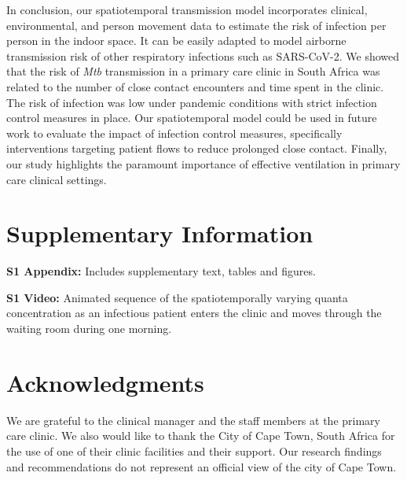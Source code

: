 \documentclass[fleqn,11pt]{wlscirep}
\begin{document}
In conclusion, our spatiotemporal transmission model incorporates clinical, environmental, and person movement data to estimate the risk of infection per person in the indoor space. It can be easily adapted to model airborne transmission risk of other respiratory infections such as SARS-CoV-2. We showed that the risk of \emph{Mtb} transmission in a primary care clinic in South Africa was related to the number of close contact encounters and time spent in the clinic. The risk of infection was low under pandemic conditions with strict infection control measures in place. Our spatiotemporal model could be used in future work to evaluate the impact of infection control measures, specifically interventions targeting patient flows to reduce prolonged close contact. Finally, our study highlights the paramount importance of effective ventilation in primary care clinical settings. 


\newpage

\section*{Supplementary Information}

\noindent\noindent\textbf{S1 Appendix:} Includes supplementary text, tables and figures.

\noindent\textbf{S1 Video:} Animated sequence of the spatiotemporally varying quanta concentration as an infectious patient enters the clinic and moves through the waiting room during one morning.

\section*{Acknowledgments}
We are grateful to the clinical manager and the staff members at the primary care clinic. We also would like to thank the City of Cape Town, South Africa for the use of one of their clinic facilities and their support. Our research findings and recommendations do not represent an official view of the city of Cape Town. 

\newpage
\end{document}
